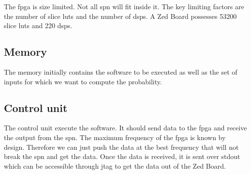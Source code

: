 The \gls{fpga} is size limited. Not all \gls{spn} will fit inside it. The key limiting factors are the number of slice \glspl{lut} and the number of \glspl{dsp}. A Zed Board possesses 53200 slice \glspl{lut} and 220 \glspl{dsp}.


\subsection{Memory}
The memory initially contains the software to be executed as well as the set of inputs for which we want to compute the probability.

\subsection{Control unit}
The control unit execute the software. It should send data to the \gls{fpga} and receive the output from the \gls{spn}. The maximum frequency of the \gls{fpga} is known by design. Therefore we can just push the data at the best frequency that will not break the \gls{spn} and get the data. Once the data is received, it is sent over stdout which can be accessible through \gls{jtag} to get the data out of the Zed Board.




